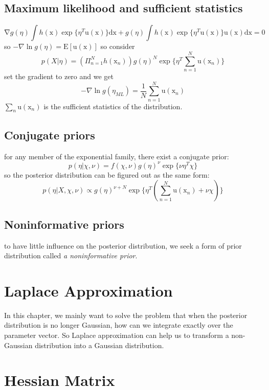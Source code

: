 \documentclass[a4paper]{book}
\begin{document}
\subsection{Maximum likelihood and sufficient statistics}
\begin{equation}\label{1.4.3}
  \mathrm  \nabla g(\eta) \int h(\mathrm  x)\exp\{\eta^T\mathrm  u(\mathrm  x)\}\mathrm  {dx} +g(\eta)\int h(\mathrm  x)\exp\{\eta^T\mathrm u(\mathrm x)\} \mathrm u(\mathrm  x) \mathrm {dx} = 0
\end{equation}
so $-\nabla \ln g(\eta) = \mathrm E[\mathrm  u(\mathrm  x)] $\newline
so consider
$$p(X|\eta)  = (\Pi_{n=1}^Nh(\mathrm  x_n))g(\eta)^N\exp\{\eta^T\sum_{n=1}^N\mathrm  u(\mathrm  x_n) \}$$
set the gradient to zero and we get
\begin{equation}\label{1.4.4}
  -\nabla \ln g(\eta_{ML} ) = \frac1N\sum_{n=1}^N\mathrm  u(\mathrm  x_n)
\end{equation}
$\sum_n\mathrm  u(\mathrm  x_n)$ is the sufficient statistics of the distribution.
\subsection{Conjugate priors}
for any member of the exponential family, there exist a conjugate  prior:
$$p(\eta|\chi, \nu) = f(\chi,\nu)g(\eta)^\nu\exp\{\nu\eta^T\chi\}$$
so the posterior distribution can be figured out as the same form:
$$p(\eta|X,\chi,\nu) \propto g(\eta)^{\nu+N}\exp\{\eta^T(\sum_{n=1}^N\mathrm  u(\mathrm  x_n)+\nu\chi)\}$$
\subsection{Noninformative priors}
to have little influence on the posterior distribution, we seek a form of prior distribution called \emph{a noninformative prior}.






\section{Laplace Approximation}\label{Laplace Appro}
In this chapter, we mainly want to solve the problem that when the posterior distribution is no longer Gaussian, how can we integrate exactly over the parameter vector.\newline
So Laplace approximation can help us to transform a non-Gaussian distribution  into a Gaussian distribution.
\section{Hessian Matrix}
\end{document}
